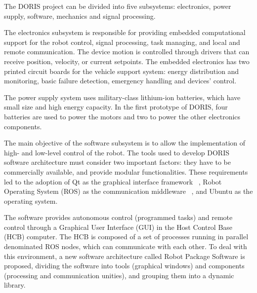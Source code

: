 \documentclass{ifacconf}
\begin{document}
The DORIS project can be divided into five subsystems: electronics, power
supply, software, mechanics and signal processing.

The electronics subsystem is responsible for providing embedded computational
support for the robot control, signal processing, task managing, and local and
remote communication. The device motion is controlled through drivers that can
receive position, velocity, or current setpoints. The embedded electronics has
two printed circuit boards for the vehicle support system: energy distribution
and monitoring, basic failure detection, emergency handling and devices'
control.

The power supply system uses military-class lithium-ion batteries, which have
small size and high energy capacity. In the first prototype of DORIS, four
batteries are used to power the motors and two to power the other electronics
components. 


The main objective of the software subsystem is to allow the implementation of
high- and low-level control of the robot. The tools used to develop DORIS
software architecture must consider two important factors: they have to be
commercially available, and provide modular functionalities. These requirements
led to the adoption of Qt as the graphical interface framework ~\cite{qt},
Robot Operating System (ROS) as the communication middleware ~\cite{ros}, and
Ubuntu as the operating system.

The software provides autonomous control (programmed tasks) and remote control
through a Graphical User Interface (GUI) in the Host Control Base (HCB)
computer. The HCB is composed of a set of processes running in parallel
denominated ROS nodes, which can communicate with each other. To deal with this
environment, a new software architecture called Robot Package Software is
proposed, dividing the software into tools (graphical windows) and components
(processing and communication unities), and grouping them into a dynamic
library. 
\end{document}

